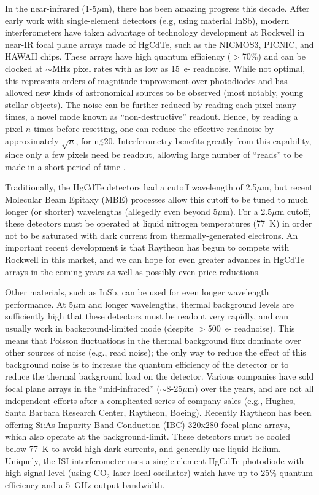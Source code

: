 \documentclass[12pt]{iopart}
\newcommand{\simle}{\mbox{$\stackrel{<}{_{\sim}}$}}
\begin{document}
In the near-infrared (1-5$\mu$m), there has been amazing progress this
decade.  After early work with single-element detectors (e.g, using
material InSb), modern interferometers have taken advantage of
technology development at Rockwell in near-IR focal plane arrays made
of HgCdTe, such as the NICMOS3, PICNIC, and HAWAII chips.  These
arrays have high quantum efficiency ($>$70\%) and can be clocked at
$\sim$MHz pixel rates with as low as 15~e- readnoise.  While not
optimal, this represents orders-of-magnitude improvement over
photodiodes and has allowed new kinds of astronomical sources to be
observed (most notably, young stellar objects).  The noise can be
further reduced by reading each pixel many times, a novel mode known as
``non-destructive'' readout.  Hence, by reading a pixel $n$ times
before resetting, one can reduce the effective readnoise by
approximately $\sqrt{n}$, for n$\simle$20.  Interferometry benefits
greatly from this capability, since only a few pixels need be readout,
allowing large number of ``reads'' to be made in a short period of
time \citep[interferometry reference][]{rmg1999b}.

Traditionally, the HgCdTe detectors had a cutoff wavelength of
2.5$\mu$m, but recent Molecular Beam Epitaxy (MBE) processes allow
this cutoff to be tuned to much longer (or shorter) wavelengths
(allegedly even beyond 5$\mu$m).  For a 2.5$\mu$m cutoff, these
detectors must be operated at liquid nitrogen temperatures (77~K) in
order not to be saturated with dark current from thermally-generated
electrons.  An important recent development is that Raytheon has begun
to compete with Rockwell in this market, and we can hope for even
greater advances in HgCdTe arrays in the coming years as well as
possibly even price reductions.

Other materials, such as InSb, can be used for even longer wavelength
performance.  At 5$\mu$m and longer wavelengths, thermal background
levels are sufficiently high that these detectors must be readout very
rapidly, and can usually work in background-limited mode (despite
$>$500~e- readnoise).  This means that Poisson fluctuations in the
thermal background flux dominate over other sources of noise (e.g.,
read noise); the only way to reduce the effect of this background
noise is to increase the quantum efficiency of the detector or to
reduce the thermal background load on the detector.  Various companies
have sold focal plane arrays in the ``mid-infrared''
($\sim$8-25$\mu$m) over the years, and are not all independent efforts
after a complicated series of company sales (e.g., Hughes, Santa
Barbara Research Center, Raytheon, Boeing).  Recently Raytheon
has been offering Si:As Impurity Band Conduction (IBC) 320x280 focal
plane arrays, which also operate at the background-limit.  These
detectors must be cooled below 77~K to avoid high dark currents, and
generally use liquid Helium.  Uniquely, the ISI interferometer uses a
single-element HgCdTe photodiode with high signal level (using CO$_2$
laser local oscillator) which have up to 25\% quantum efficiency and a
5~GHz output bandwidth.
\end{document}
